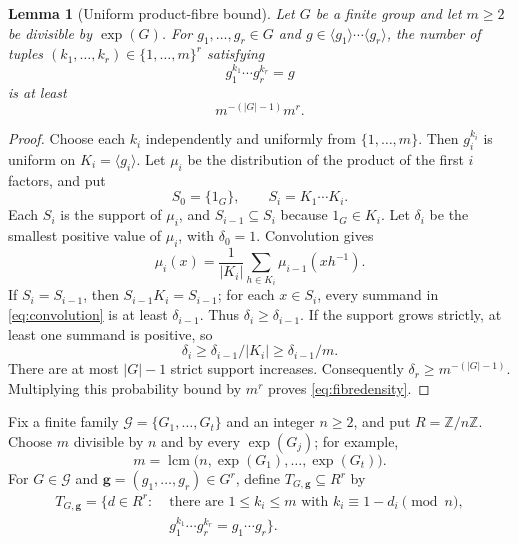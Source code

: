 \documentclass[11pt,reqno]{amsart}
\newtheorem{lemma}[theorem]{Lemma}
\theoremstyle{definition}
\numberwithin{equation}{section}
\newcommand{\expon}{\operatorname{exp}}
\newcommand{\Z}{\mathbb{Z}}
\newcommand{\calG}{\mathcal{G}}
\renewcommand{\leq}{\leqslant}
\renewcommand{\geq}{\geqslant}
\begin{document}
\begin{lemma}[Uniform product-fibre bound]\label{lem:fibres}
Let $G$ be a finite group and let $m\geq 2$ be divisible by $\expon(G)$. For $g_1,\ldots,g_r\in G$ and $g\in\langle g_1\rangle\cdots\langle g_r\rangle$, the number of tuples $(k_1,\ldots,k_r)\in\{1,\ldots,m\}^r$ satisfying
\[
 g_1^{k_1}\cdots g_r^{k_r}=g
\]
is at least
\begin{equation}\label{eq:fibredensity}
 m^{-(|G|-1)}m^r.
\end{equation}
\end{lemma}
\begin{proof}
Choose each $k_i$ independently and uniformly from $\{1,\ldots,m\}$. Then $g_i^{k_i}$ is uniform on $K_i=\langle g_i\rangle$. Let $\mu_i$ be the distribution of the product of the first $i$ factors, and put
\[
 S_0=\{1_G\},\qquad S_i=K_1\cdots K_i.
\]
Each $S_i$ is the support of $\mu_i$, and $S_{i-1}\subseteq S_i$ because $1_G\in K_i$. Let $\delta_i$ be the smallest positive value of $\mu_i$, with $\delta_0=1$. Convolution gives
\begin{equation}\label{eq:convolution}
 \mu_i(x)=\frac{1}{|K_i|}\sum_{h\in K_i}\mu_{i-1}(xh^{-1}).
\end{equation}
If $S_i=S_{i-1}$, then $S_{i-1}K_i=S_{i-1}$; for each $x\in S_i$, every summand in \eqref{eq:convolution} is at least $\delta_{i-1}$. Thus $\delta_i\geq\delta_{i-1}$. If the support grows strictly, at least one summand is positive, so
\[
 \delta_i\geq\delta_{i-1}/|K_i|\geq\delta_{i-1}/m.
\]
There are at most $|G|-1$ strict support increases. Consequently $\delta_r\geq m^{-(|G|-1)}$. Multiplying this probability bound by $m^r$ proves \eqref{eq:fibredensity}.
\end{proof}

Fix a finite family $\calG=\{G_1,\ldots,G_t\}$ and an integer $n\geq 2$, and put $R=\Z/n\Z$. Choose $m$ divisible by $n$ and by every $\expon(G_j)$; for example,
\begin{equation}\label{eq:commonexponent}
 m=\operatorname{lcm}\bigl(n,\expon(G_1),\ldots,\expon(G_t)\bigr).
\end{equation}
For $G\in\calG$ and $\boldsymbol{g}=(g_1,\ldots,g_r)\in G^r$, define $T_{G,\boldsymbol{g}}\subseteq R^r$ by
\begin{equation}\label{eq:targetset}
 \begin{split}
 T_{G,\boldsymbol{g}}=\bigl\{d\in R^r:\;&\text{there are }1\leq k_i\leq m\text{ with }
 k_i\equiv 1-d_i\pmod n,\\[-1mm]
 &g_1^{k_1}\cdots g_r^{k_r}=g_1\cdots g_r\bigr\}.
 \end{split}
\end{equation}
\end{document}
